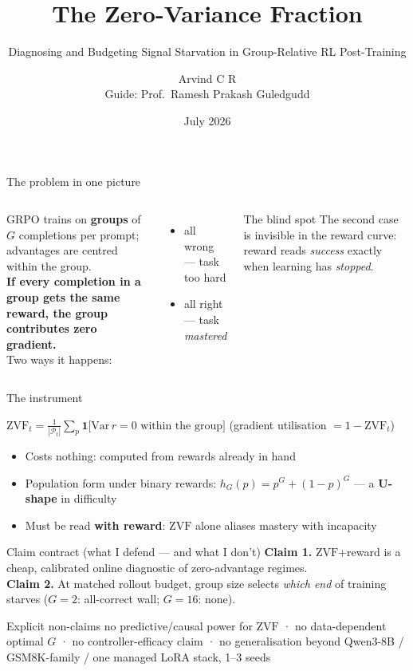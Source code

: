 \documentclass[11pt,aspectratio=169]{beamer}
\title{The Zero-Variance Fraction}
\subtitle{Diagnosing and Budgeting Signal Starvation in Group-Relative RL Post-Training}
\author{Arvind C R \\ \small Guide: Prof.\ Ramesh Prakash Guledgudd}
\institute{M.Tech Viva Voce \, · \, PES University}
\date{July 2026}
\newcommand{\ZVF}{\ensuremath{\mathrm{ZVF}}}
\begin{document}
\maketitle

\begin{frame}{The problem in one picture}
\begin{columns}
GRPO trains on \textbf{groups} of $G$ completions per prompt; advantages are
centred within the group.\\[6pt]
\textbf{If every completion in a group gets the same reward, the group
contributes \alert{zero gradient}.}\\[6pt]
Two ways it happens:
\begin{itemize}
  \item all wrong — task too hard
  \item all right — task \emph{mastered}
\end{itemize}
\begin{block}{The blind spot}
The second case is invisible in the reward curve: reward reads
\emph{success} exactly when learning has \emph{stopped}.
\end{block}
\end{columns}
\end{frame}

\begin{frame}{The instrument}
\begin{definition}
$\displaystyle \ZVF_t=\frac{1}{|\mathcal{P}_t|}\sum_{p}
\mathbf{1}\big[\mathrm{Var}\,r=0 \text{ within the group}\big]$
\qquad (gradient utilisation $=1-\ZVF_t$)
\end{definition}
\begin{itemize}
  \item Costs nothing: computed from rewards already in hand
  \item Population form under binary rewards: $h_G(p)=p^G+(1-p)^G$ —
        a \textbf{U-shape} in difficulty
  \item Must be read \textbf{with reward}: \ZVF{} alone aliases mastery
        with incapacity
\end{itemize}
\end{frame}

\begin{frame}{Claim contract (what I defend — and what I don't)}
\textbf{Claim 1.} \ZVF{}+reward is a cheap, calibrated online diagnostic of
zero-advantage regimes.\\[4pt]
\textbf{Claim 2.} At matched rollout budget, group size selects \emph{which
end} of training starves ($G{=}2$: all-correct wall; $G{=}16$: none).\\[8pt]
\begin{alertblock}{Explicit non-claims}
no predictive/causal power for \ZVF{} · no data-dependent optimal $G$ ·
no controller-efficacy claim · no generalisation beyond
Qwen3-8B / GSM8K-family / one managed LoRA stack, 1--3 seeds
\end{alertblock}
\end{frame}
\end{document}
